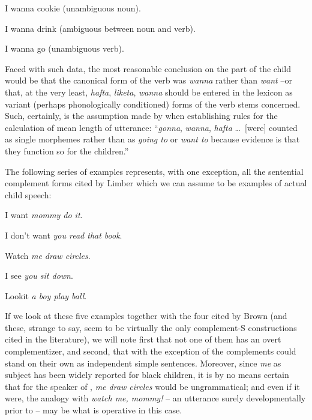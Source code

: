 \ea\label{ex:3:29}
 I wanna cookie (unambiguous noun).
\z

\ea\label{ex:3:30}
 I wanna drink (ambiguous between noun and verb).
\z

\ea\label{ex:3:31}
 I wanna go (unambiguous verb).
\z

\noindent Faced with such data, the most reasonable conclusion on the part of the child would be that the canonical form of the verb was \textit{wanna} rather than \textit{want} --or that, at the very least, \textit{hafta}, \textit{liketa}, \textit{wanna} should be entered in the lexicon as variant (perhaps phonologically conditioned) forms of the verb stems concerned. Such, certainly, is the assumption made by \citet[54]{Brown1973} when establishing rules for the calculation of mean length of utterance: ``\textit{gonna}, \textit{wanna}, \textit{hafta} \ldots~[were] counted as single morphemes rather than as \textit{going to} or \textit{want to} because evidence is that they function so for the children.''

The following series of examples represents, with one exception, all the sentential complement forms cited by Limber which we can assume to be examples of actual child speech:

\ea\label{ex:3:32}
I want \textit{mommy do it}.
\z

\ea\label{ex:3:33}
 I don't want \textit{you read that book}.
\z

\ea\label{ex:3:34}
 Watch \textit{me draw circles}.
\z

\ea\label{ex:3:35}
 I see \textit{you sit down}.
\z

\ea\label{ex:3:36}
 Lookit \textit{a boy play ball}.
\z

If we look at these five examples together with the four cited by Brown (and these, strange to say, seem to be virtually the only complement-S constructions cited in the literature), we will note first that not one of them has an overt complementizer, and second, that with the exception of  the complements could stand on their own as independent simple sentences. Moreover, since \textit{me} as subject has been widely reported for black children, it is by no means certain that for the speaker of , \textit{me draw circles} would be ungrammatical; and even if it were, the analogy with \textit{watch me, mommy!} -- an utterance surely developmentally prior to  -- may be what is operative in this case.

